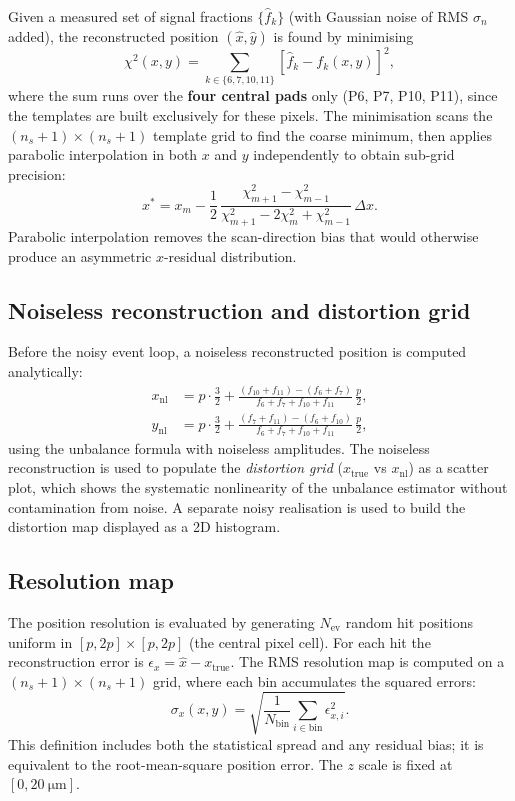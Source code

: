 \documentclass[preprint,numbers,1p]{elsarticle}
\begin{document}
Given a measured set of signal fractions $\{\hat{f}_k\}$ (with Gaussian noise of RMS
$\sigma_n$ added), the reconstructed position $(\hat{x}, \hat{y})$ is found by minimising
\begin{equation}
  \chi^2(x,y) = \sum_{k \in \{6,7,10,11\}} [\hat{f}_k - f_k(x,y)]^2,
\end{equation}
where the sum runs over the \textbf{four central pads} only (P6, P7, P10, P11), since the
templates are built exclusively for these pixels.
The minimisation scans the $(n_s+1)\times(n_s+1)$ template grid to find the coarse minimum, then applies
parabolic interpolation in both $x$ and $y$ independently to obtain sub-grid precision:
\begin{equation}
  x^* = x_m - \frac{1}{2}\,\frac{\chi^2_{m+1} - \chi^2_{m-1}}{\chi^2_{m+1} - 2\chi^2_m + \chi^2_{m-1}}\,\Delta x.
\end{equation}
Parabolic interpolation removes the scan-direction bias that would otherwise produce an
asymmetric $x$-residual distribution.

\subsection{Noiseless reconstruction and distortion grid}
\label{sec:noiseless}

Before the noisy event loop, a noiseless reconstructed position is computed analytically:
\begin{align}
  x_\mathrm{nl} &= p\cdot\frac{3}{2} + \frac{(f_{10}+f_{11})-(f_6+f_7)}{f_6+f_7+f_{10}+f_{11}}\,\frac{p}{2}, \\
  y_\mathrm{nl} &= p\cdot\frac{3}{2} + \frac{(f_7+f_{11})-(f_6+f_{10})}{f_6+f_7+f_{10}+f_{11}}\,\frac{p}{2},
\end{align}
using the unbalance formula with noiseless amplitudes. The noiseless reconstruction is used
to populate the \emph{distortion grid} ($x_\mathrm{true}$ vs $x_\mathrm{nl}$) as a scatter
plot, which shows the systematic nonlinearity of the unbalance estimator without contamination
from noise. A separate noisy realisation is used to build the distortion map displayed as a
2D histogram.

\subsection{Resolution map}
\label{sec:resmap}

The position resolution is evaluated by generating $N_\mathrm{ev}$ random hit positions uniform
in $[p, 2p] \times [p, 2p]$ (the central pixel cell). For each hit the reconstruction error is
$\epsilon_x = \hat{x} - x_\mathrm{true}$. The RMS resolution map is computed on a
$(n_s+1)\times(n_s+1)$ grid, where each bin accumulates the squared errors:
\begin{equation}
  \sigma_x(x,y) = \sqrt{\frac{1}{N_\mathrm{bin}}\sum_{i\in\mathrm{bin}} \epsilon_{x,i}^2}.
\end{equation}
This definition includes both the statistical spread and any residual bias; it is equivalent
to the root-mean-square position error. The $z$ scale is fixed at $[0, \SI{20}{\micro\meter}]$.
\end{document}
